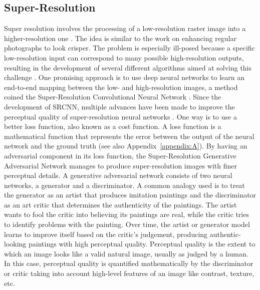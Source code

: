 \documentclass[tc, noline]{copernicus}
\begin{document}
\subsection{Super-Resolution} \label{section:superresolution}

Super resolution involves the processing of a low-resolution raster image into a higher-resolution one \citep{TsaiMultiframeimagerestoration1984}.
The idea is similar to the work on enhancing regular photographs to look crisper.
The problem is especially ill-posed because a specific low-resolution input can correspond to many possible high-resolution outputs, resulting in the development of several different algorithms aimed at solving this challenge \citep[see][for a review]{NasrollahiSuperresolutioncomprehensivesurvey2014}.
One promising approach is to use deep neural networks \citep{LeCunDeeplearning2015} to learn an end-to-end mapping between the low- and high-resolution images, a method coined the Super-Resolution Convolutional Neural Network \citep[SRCNN;][]{DongImageSuperResolutionUsing2014}.
Since the development of SRCNN, multiple advances have been made to improve the perceptual quality of super-resolution neural networks \citep[see][for a review]{YangDeepLearningSingle2019}.
One way is to use a better loss function, also known as a cost function.
A loss function is a mathematical function that represents the error between the output of the neural network and the ground truth (see also Appendix~\ref{appendix:A}).
By having an adversarial component in its loss function, the Super-Resolution Generative Adversarial Network \citep[SRGAN;][]{LedigPhotoRealisticSingleImage2017} manages to produce super-resolution images with finer perceptual details.
A generative adversarial network \citep{GoodfellowGenerativeAdversarialNetworks2014} consists of two neural networks, a generator and a discriminator.
A common analogy used is to treat the generator as an artist that produces imitation paintings and the discriminator as an art critic that determines the authenticity of the paintings.
The artist wants to fool the critic into believing its paintings are real, while the critic tries to identify problems with the painting.
Over time, the artist or generator model learns to improve itself based on the critic's judgement, producing authentic-looking paintings with high perceptual quality.
Perceptual quality is the extent to which an image looks like a valid natural image, usually as judged by a human.
In this case, perceptual quality is quantified mathematically by the discriminator or critic taking into account high-level features of an image like contrast, texture, etc.
\end{document}
